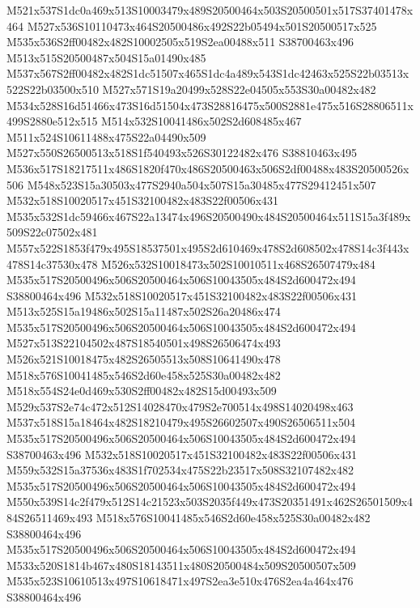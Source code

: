\documentclass{article}
\begin{document}
\begin{multicols}{2}
M521x537S1dc0a469x513S10003479x489S20500464x503S20500501x517S37401478x464 M527x536S10110473x464S20500486x492S22b05494x501S20500517x525 M535x536S2ff00482x482S10002505x519S2ea00488x511 S38700463x496 M513x515S20500487x504S15a01490x485 M537x567S2ff00482x482S1dc51507x465S1dc4a489x543S1dc42463x525S22b03513x522S22b03500x510 M527x571S19a20499x528S22e04505x553S30a00482x482 M534x528S16d51466x473S16d51504x473S28816475x500S2881e475x516S28806511x499S2880e512x515 M514x532S10041486x502S2d608485x467 M511x524S10611488x475S22a04490x509 M527x550S26500513x518S1f540493x526S30122482x476 S38810463x495 M536x517S18217511x486S1820f470x486S20500463x506S2df00488x483S20500526x506 M548x523S15a30503x477S2940a504x507S15a30485x477S29412451x507 M532x518S10020517x451S32100482x483S22f00506x431 M535x532S1dc59466x467S22a13474x496S20500490x484S20500464x511S15a3f489x509S22c07502x481 M557x522S1853f479x495S18537501x495S2d610469x478S2d608502x478S14c3f443x478S14c37530x478 M526x532S10018473x502S10010511x468S26507479x484 M535x517S20500496x506S20500464x506S10043505x484S2d600472x494 S38800464x496 M532x518S10020517x451S32100482x483S22f00506x431 M513x525S15a19486x502S15a11487x502S26a20486x474 M535x517S20500496x506S20500464x506S10043505x484S2d600472x494 M527x513S22104502x487S18540501x498S26506474x493 M526x521S10018475x482S26505513x508S10641490x478 M518x576S10041485x546S2d60e458x525S30a00482x482 M518x554S24e0d469x530S2ff00482x482S15d00493x509 M529x537S2e74c472x512S14028470x479S2e700514x498S14020498x463 M537x518S15a18464x482S18210479x495S26602507x490S26506511x504 M535x517S20500496x506S20500464x506S10043505x484S2d600472x494 S38700463x496 M532x518S10020517x451S32100482x483S22f00506x431 M559x532S15a37536x483S1f702534x475S22b23517x508S32107482x482 M535x517S20500496x506S20500464x506S10043505x484S2d600472x494 M550x539S14c2f479x512S14c21523x503S2035f449x473S20351491x462S26501509x484S26511469x493 M518x576S10041485x546S2d60e458x525S30a00482x482 S38800464x496 M535x517S20500496x506S20500464x506S10043505x484S2d600472x494 M533x520S1814b467x480S18143511x480S20500484x509S20500507x509 M535x523S10610513x497S10618471x497S2ea3e510x476S2ea4a464x476 S38800464x496




\end{multicols}
\end{document}
